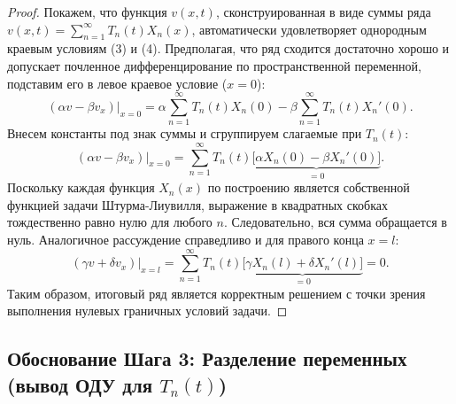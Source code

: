 \documentclass[a4paper,10pt]{article}
\begin{document}
\begin{proof}
Покажем, что функция $v(x,t)$, сконструированная в виде суммы ряда $v(x,t) = \sum_{n=1}^\infty T_n(t) X_n(x)$, автоматически удовлетворяет однородным краевым условиям (3) и (4).
Предполагая, что ряд сходится достаточно хорошо и допускает почленное дифференцирование по пространственной переменной, подставим его в левое краевое условие ($x=0$):
\[ (\alpha v - \beta v_x)\big|_{x=0} = \alpha \sum_{n=1}^\infty T_n(t) X_n(0) - \beta \sum_{n=1}^\infty T_n(t) X_n'(0). \]
Внесем константы под знак суммы и сгруппируем слагаемые при $T_n(t)$:
\[ (\alpha v - \beta v_x)\big|_{x=0} = \sum_{n=1}^\infty T_n(t) \underbrace{\big[ \alpha X_n(0) - \beta X_n'(0) \big]}_{=0}. \]
Поскольку каждая функция $X_n(x)$ по построению является собственной функцией задачи Штурма-Лиувилля, выражение в квадратных скобках тождественно равно нулю для любого $n$. Следовательно, вся сумма обращается в нуль. 
Аналогичное рассуждение справедливо и для правого конца $x=l$:
\[ (\gamma v + \delta v_x)\big|_{x=l} = \sum_{n=1}^\infty T_n(t) \underbrace{\big[ \gamma X_n(l) + \delta X_n'(l) \big]}_{=0} = 0. \]
Таким образом, итоговый ряд является корректным решением с точки зрения выполнения нулевых граничных условий задачи.
\end{proof}

\subsection*{Обоснование Шага 3: Разделение переменных (вывод ОДУ для $T_n(t)$)}
\end{document}
